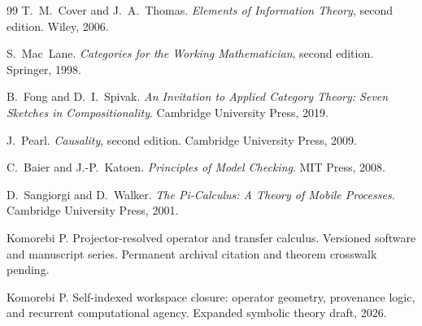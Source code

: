 \documentclass[11pt]{article}
\theoremstyle{definition}
\theoremstyle{remark}
\begin{document}
\begin{thebibliography}{99}
T.~M.~Cover and J.~A.~Thomas.
\newblock \emph{Elements of Information Theory}, second edition.
\newblock Wiley, 2006.

S.~Mac~Lane.
\newblock \emph{Categories for the Working Mathematician}, second edition.
\newblock Springer, 1998.

B.~Fong and D.~I.~Spivak.
\newblock \emph{An Invitation to Applied Category Theory: Seven Sketches in Compositionality}.
\newblock Cambridge University Press, 2019.

J.~Pearl.
\newblock \emph{Causality}, second edition.
\newblock Cambridge University Press, 2009.

C.~Baier and J.-P.~Katoen.
\newblock \emph{Principles of Model Checking}.
\newblock MIT Press, 2008.

D.~Sangiorgi and D.~Walker.
\newblock \emph{The Pi-Calculus: A Theory of Mobile Processes}.
\newblock Cambridge University Press, 2001.

Komorebi P.
\newblock Projector-resolved operator and transfer calculus.
\newblock Versioned software and manuscript series. Permanent archival citation and theorem crosswalk pending.

Komorebi P.
\newblock Self-indexed workspace closure: operator geometry, provenance logic, and recurrent computational agency.
\newblock Expanded symbolic theory draft, 2026.

\end{thebibliography}
\end{document}
